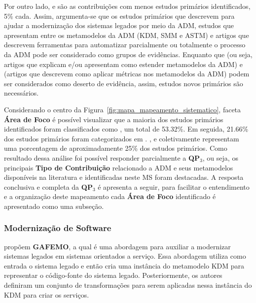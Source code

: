 Por outro lado,  e  são as contribuições com menos estudos primários identificados, 5\% cada. Assim, argumenta-se que os estudos primários que descrevem  para ajudar a modernização dos sistemas legados por meio da ADM, estudos que apresentam  entre os metamodelos da ADM (KDM, SMM e ASTM) e artigos que descrevem ferramentas para automatizar parcialmente ou totalmente o processo da ADM pode ser considerado como grupos de evidências. Enquanto que  (ou seja, artigos que explicam e/ou apresentam como estender metamodelos da ADM) e  (artigos que descrevem como aplicar métricas nos metamodelos da ADM) podem ser considerados como deserto de evidência, assim, estudos novos primários são necessários.

Considerando o centro da Figura~\ref{fig:mapa_mapeamento_sistematico}, faceta \textbf{Área de Foco} é possível visualizar que a maioria dos estudos primários identificados foram classificados como , um total de 53.32\%. Em seguida, 21.66\% dos estudos primários foram categorizados em . ,  e  coletivamente representam uma porcentagem de aproximadamente 25\% dos estudos primários. Como resultado dessa análise foi possível responder parcialmente a \textbf{QP$_3$}, ou seja, os principais \textbf{Tipo de Contribuição} relacionado a ADM e seus metamodelos disponíveis na literatura e identificadas neste MS foram destacadas. A resposta conclusiva e completa da \textbf{QP$_3$} é apresenta a seguir, para facilitar o entendimento e a organização deste mapeamento cada \textbf{Área de Foco} identificado é apresentado como uma subseção.


\subsubsection{Modernização de Software} %
\label{ssub:approach}

 propõem \textbf{GAFEMO}, a qual é uma abordagem para auxiliar a modernizar sistemas legados em sistemas orientados a serviço. Essa abordagem utiliza como entrada o sistema legado e então cria uma instância do metamodelo KDM para representar o código-fonte do sistema legado. Posteriormente, os autores definiram um conjunto de transformações para serem aplicadas nessa instância do KDM para criar os serviços.


